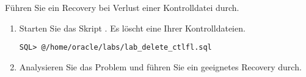     \item Führen Sie ein Recovery bei Verlust einer Kontrolldatei durch.
      \begin{enumerate}
        \item Starten Sie das Skript . Es löscht eine Ihrer Kontrolldateien.
          \begin{lstlisting}[language=terminal]
SQL> @/home/oracle/labs/lab_delete_ctlfl.sql
          \end{lstlisting}
        \item Analysieren Sie das Problem und führen Sie ein geeignetes Recovery durch.
      \end{enumerate}
